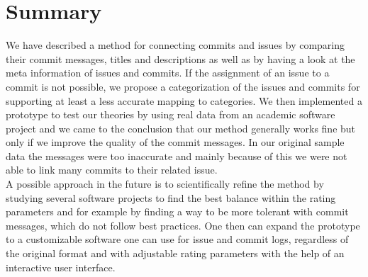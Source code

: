 \section{Summary}
\label{sec:summary}
We have described a method for connecting commits and issues by comparing their commit messages, titles and descriptions as well as by having a look at the meta information of issues and commits.
If the assignment of an issue to a commit is not possible, we propose a categorization of the issues and commits for supporting at least a less accurate mapping to categories.
We then implemented a prototype to test our theories by using real data from an academic software project and we came to the conclusion that our method generally works fine but only if we improve the quality of the commit messages.
In our original sample data the messages were too inaccurate and mainly because of this we were not able to link many commits to their related issue.\\

A possible approach in the future is to scientifically refine the method by studying several software projects to find the best balance within the rating parameters and for example by finding a way to be more tolerant with commit messages, which do not follow best practices.
One then can expand the prototype to a customizable software one can use for issue and commit logs, regardless of the original format and with adjustable rating parameters with the help of an interactive user interface.